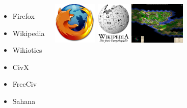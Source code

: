 
\begin{frame} 

\begin{columns}[T] 
\column{1.5in} 
\begin{itemize}
	\item Firefox
	\item Wikipedia
	\item Wikiotics
	\item CivX
	\item FreeCiv
	\item Sahana
\end{itemize}

\column{1.5in} 
\includegraphics[height=2cm]{images/ff-logo.png}
\vspace{1cm}
\includegraphics[height=2cm]{images/wiki-logo.png}
\vspace{1cm}
\includegraphics[height=2cm]{images/freeciv-logo.png}
\end{columns}
\end{frame}


